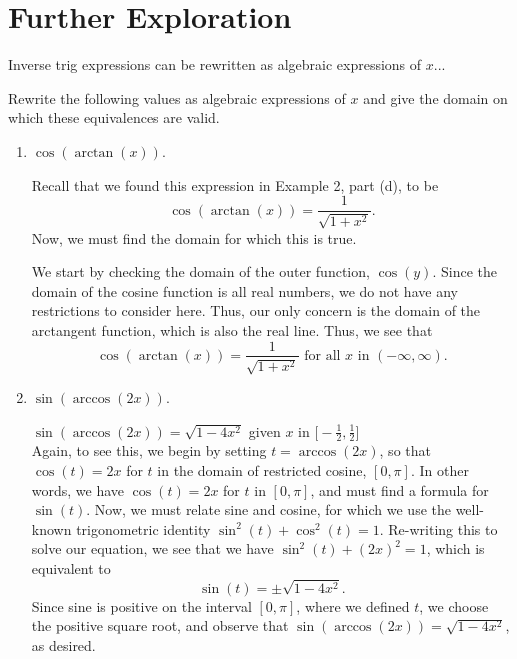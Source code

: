 \documentclass{ximera}
\begin{document}



\section{Further Exploration}

Inverse trig expressions can be rewritten as algebraic expressions of $x$...

\begin{example}
Rewrite the following values as algebraic expressions of $x$ and give the domain on which these equivalences are valid.
\begin{enumerate}
\item $\cos(\arctan(x))$.\\
%
\begin{explanation}
Recall that we found this expression in Example 2, part (d), to be
$$\cos(\arctan(x)) = \frac{1}{\sqrt{1+x^2}}.$$ %
%
Now, we must find the domain for which this is true.

We start by checking the domain of the outer function, $\cos(y)$. Since the domain of the cosine function is all real numbers, we do not have any restrictions to consider here. Thus, our only concern is the domain of the arctangent function, which is also the real line. Thus, we see that 
$$\cos(\arctan(x)) = \frac{1}{\sqrt{1+x^2}} \text{ for all } x \text{ in } (-\infty, \infty).$$  
\end{explanation}
%
\item $\sin(\arccos(2x))$. \\
%
\begin{explanation}
$\sin(\arccos(2x)) = \sqrt{1-4x^2}$ given $x$ in $\Big[-\!\frac{1}{2}, \frac{1}{2}\Big]$\\
%
Again, to see this, we begin by setting $t = \arccos(2x)$, so that $\cos(t) = 2x$ for $t$ in the domain of restricted cosine, $[0,\pi]$. In other words, we have $\cos(t) = 2x$ for $t$ in $[0, \pi]$, and must find a formula for $\sin(t)$. Now, we must relate sine and cosine, for which we use the well-known trigonometric identity $\sin^2(t) + \cos^2(t) = 1$. Re-writing this to solve our equation, we see that we have $\sin^2(t) + (2x)^2 =1$, which is equivalent to 
%
$$\sin(t) = \pm \sqrt{1-4x^2}.$$
%
Since sine is positive on the interval $[0,\pi]$, where we defined $t$, we choose the positive square root, and observe that $\sin(\arccos(2x)) = \sqrt{1-4x^2}$, as desired.


\end{explanation}
\end{enumerate}
\end{example}
\end{document}
